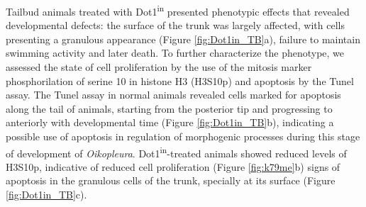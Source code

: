 \documentclass[11pt,twoside,a4paper]{report}
\begin{document}
	Tailbud animals treated with Dot1\textsuperscript{in} presented phenotypic effects that revealed developmental defects: the surface of the trunk was largely affected, with cells presenting a granulous appearance (Figure \ref{fig:Dot1in_TB}a), failure to maintain swimming activity and later death. To further characterize the phenotype, we assessed the state of cell proliferation by the use of the mitosis marker phosphorilation of serine 10 in histone H3 (H3S10p) and apoptosis by the Tunel assay. The Tunel assay in normal animals revealed cells marked for apoptosis along the tail of animals, starting from the posterior tip and progressing to anteriorly with developmental time (Figure \ref{fig:Dot1in_TB}b), indicating a possible use of apoptosis in regulation of morphogenic processes during this stage of development of \textit{Oikopleura}. Dot1\textsuperscript{in}-treated animals showed reduced levels of H3S10p, indicative of reduced cell proliferation (Figure \ref{fig:k79me}b) signs of apoptosis in the granulous cells of the trunk, specially at its surface (Figure \ref{fig:Dot1in_TB}c).
	
\end{document}
